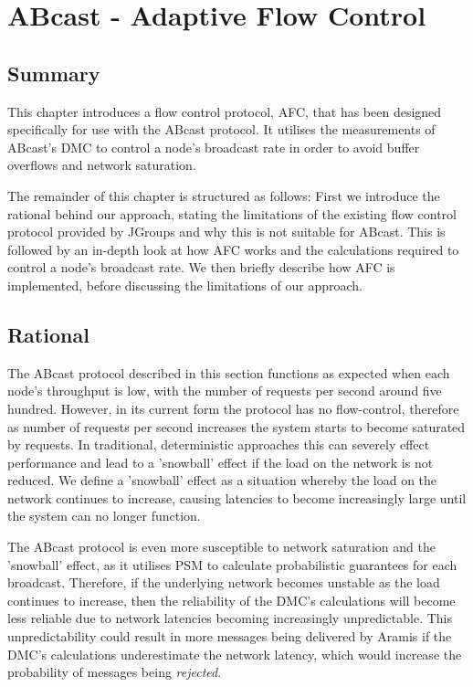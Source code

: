 \chapter{ABcast - Adaptive Flow Control}

    \graphicspath{{Chapter5-FlowControl/Figs/Vector/}{Chapter5-FlowControl/Figs/}}

\section{Summary}
This chapter introduces a flow control protocol, AFC, that has been designed specifically for use with the \textsf{ABcast} protocol.  It utilises the measurements of \textsf{ABcast}'s DMC to control a node's broadcast rate in order to avoid buffer overflows and network saturation.  

The remainder of this chapter is structured as follows: First we introduce the rational behind our approach, stating the limitations of the existing flow control protocol provided by JGroups and why this is not suitable for \textsf{ABcast}.  This is followed by an in-depth look at how AFC works and the calculations required to control a node's broadcast rate.  We then briefly describe how AFC is implemented, before discussing the limitations of our approach.  

\section{Rational}
The \textsf{ABcast} protocol described in this section functions as expected when each node's throughput is low, with the number of requests per second around five hundred.  However, in its current form the protocol has no flow-control, therefore as number of requests per second increases the system starts to become saturated by requests.  In traditional, deterministic approaches this can severely effect performance and lead to a 'snowball' effect if the load on the network is not reduced.  We define a 'snowball' effect as a situation whereby the load on the network continues to increase, causing latencies to become increasingly large until the system can no longer function.  

The \textsf{ABcast} protocol is even more susceptible to network saturation and the 'snowball' effect, as it utilises PSM to calculate probabilistic guarantees for each broadcast. Therefore, if the underlying network becomes unstable as the load continues to increase, then the reliability of the DMC's calculations will become less reliable due to network latencies becoming increasingly unpredictable.  This unpredictability could result in more messages being delivered by \textsf{Aramis} if the DMC's calculations underestimate the network latency, which would increase the probability of messages being \emph{rejected}.  

